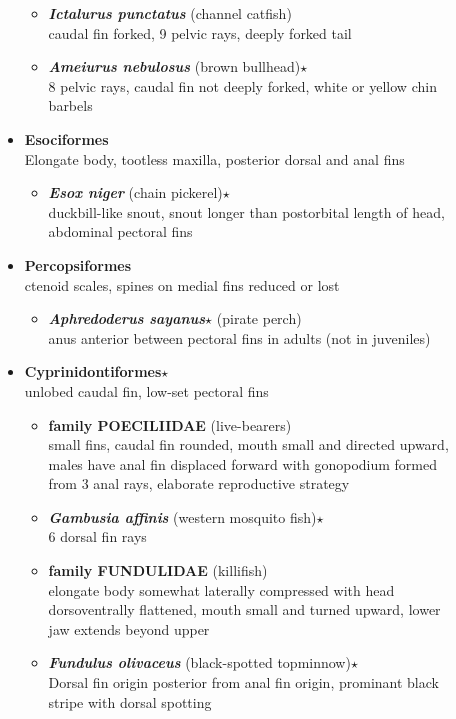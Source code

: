 \documentclass[a4paper,12pt]{article}
\begin{document}
\begin{description}
\begin{itemize}
  \begin{itemize}
    \item{\textbf{\textit{   Ictalurus punctatus}} (channel catfish)} \\ caudal fin forked, 9 pelvic rays, deeply forked tail
    \item{\textbf{\textit{   Ameiurus nebulosus}} (brown bullhead)$\star$} \\ 8 pelvic rays, caudal fin not deeply forked, white or yellow chin barbels
  \end{itemize}
  \item{\textbf{Esociformes}} \\ Elongate body, tootless maxilla, posterior dorsal and anal fins
  \begin{itemize}
    \item{\textbf{\textit{   Esox niger}} (chain pickerel)$\star$} \\ duckbill-like snout, snout longer than postorbital length of head, abdominal pectoral fins
  \end{itemize}
  \item{\textbf{Percopsiformes}} \\ ctenoid scales, spines on medial fins reduced or lost
  \begin{itemize}
    \item{\textbf{\textit{   Aphredoderus sayanus}$\star$} (pirate perch)} \\ anus anterior between pectoral fins in adults (not in juveniles)
  \end{itemize} 
  \item{\textbf{Cyprinidontiformes}$\star$} \\ unlobed caudal fin, low-set pectoral fins
  \begin{itemize}
    \item{\textbf{family POECILIIDAE} (live-bearers)} \\ small fins, caudal fin rounded, mouth small and directed upward, males have anal fin displaced forward with gonopodium formed from 3 anal rays, elaborate reproductive strategy
    \item{\textbf{\textit{   Gambusia affinis}} (western mosquito fish)$\star$} \\ 6 dorsal fin rays
    \item{\textbf{family FUNDULIDAE} (killifish)} \\ elongate body somewhat laterally compressed with head dorsoventrally flattened, mouth small and turned upward, lower jaw extends beyond upper
    \item{\textbf{\textit{   Fundulus olivaceus}} (black-spotted topminnow)$\star$} \\ Dorsal fin origin posterior from anal fin origin, prominant black stripe with dorsal spotting

\end{itemize}
\end{itemize}
\end{description}
\end{document}
